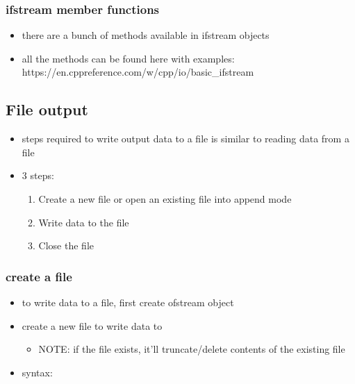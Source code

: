 \documentclass[11pt]{article}
\providecommand{\tightlist}{%
      \setlength{\itemsep}{0pt}\setlength{\parskip}{0pt}}
\begin{document}
    \hypertarget{ifstream-member-functions}{%
\subsubsection{ifstream member
functions}\label{ifstream-member-functions}}

\begin{itemize}
\tightlist
\item
  there are a bunch of methods available in ifstream objects
\item
  all the methods can be found here with examples:
  https://en.cppreference.com/w/cpp/io/basic\_ifstream
\end{itemize}

    \hypertarget{file-output}{%
\subsection{File output}\label{file-output}}

\begin{itemize}
\tightlist
\item
  steps required to write output data to a file is similar to reading
  data from a file
\item
  3 steps:

  \begin{enumerate}
  \def\labelenumi{\arabic{enumi}.}
  \tightlist
  \item
    Create a new file or open an existing file into append mode
  \item
    Write data to the file
  \item
    Close the file
  \end{enumerate}
\end{itemize}

\hypertarget{create-a-file}{%
\subsubsection{create a file}\label{create-a-file}}

\begin{itemize}
\tightlist
\item
  to write data to a file, first create ofstream object
\item
  create a new file to write data to

  \begin{itemize}
  \tightlist
  \item
    NOTE: if the file exists, it'll truncate/delete contents of the
    existing file
  \end{itemize}
\item
  syntax:
\end{itemize}
\end{document}
